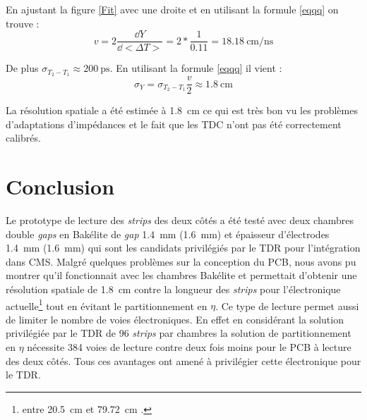En ajustant la figure \ref{Fit} avec une droite et en utilisant la formule \ref{eqqq} on trouve :
\begin{equation}
v=2\frac{\dd Y}{\dd <\Delta T>}=2*\frac{1}{0.11}=\SI{18.18}{\centi\meter\per\nano\second}
\end{equation}

De plus $\sigma_{T_2-T_1}\approx\SI{200}{\pico\second}$. En utilisant la formule \ref{eqqq} il vient :
\begin{equation}
\sigma_{Y}=\sigma_{T_2-T_1}\frac{v}{2}\approx\SI{1.8}{\centi\meter}
\end{equation}

La résolution spatiale a été estimée à \SI{1.8}{\centi\meter} ce qui est très bon vu les problèmes d'adaptations d'impédances et le fait que les TDC n'ont pas été correctement calibrés.

\section{Conclusion}
Le prototype de lecture des \textit{strips} des deux côtés a été testé avec deux chambres double \textit{gaps} en Bakélite de \textit{gap} \SI{1.4}{\milli\meter} (\SI{1.6}{\milli\meter}) et épaisseur d'électrodes \SI{1.4}{\milli\meter} (\SI{1.6}{\milli\meter}) qui sont les candidats privilégiés par le TDR pour l'intégration dans CMS. Malgré quelques problèmes sur la conception du PCB, nous avons pu montrer qu'il fonctionnait avec les chambres Bakélite et permettait d'obtenir une résolution spatiale de \SI{1.8}{\centi\meter} contre la longueur des \textit{strips} pour l'électronique actuelle\footnote{entre \SI{20.5}{\centi\meter} et \SI{79.72}{\centi\meter} \cite{gapss}.} tout en évitant le partitionnement en $\eta$. Ce type de lecture permet aussi de limiter le nombre de voies électroniques. En effet en considérant la solution privilégiée par le TDR de \num{96} \textit{strips} par chambres la solution de partitionnement en $\eta$ nécessite \num{384} voies de lecture contre deux fois moins pour le PCB à lecture des deux côtés. Tous ces avantages ont amené à privilégier cette électronique pour le TDR.